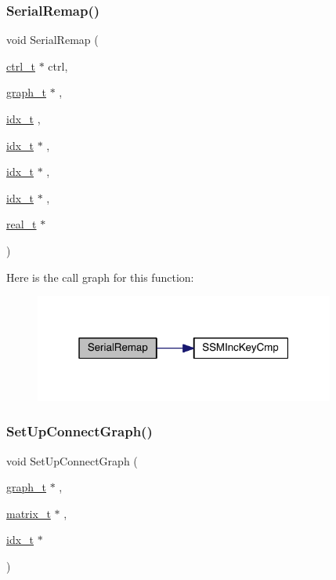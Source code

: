 \subsubsection{\texorpdfstring{Serial\+Remap()}{SerialRemap()}}
{\footnotesize\ttfamily void Serial\+Remap (\begin{DoxyParamCaption}\item[{\hyperlink{a00742}{ctrl\+\_\+t} $\ast$}]{ctrl,  }\item[{\hyperlink{a00734}{graph\+\_\+t} $\ast$}]{,  }\item[{\hyperlink{a00876_aaa5262be3e700770163401acb0150f52}{idx\+\_\+t}}]{,  }\item[{\hyperlink{a00876_aaa5262be3e700770163401acb0150f52}{idx\+\_\+t} $\ast$}]{,  }\item[{\hyperlink{a00876_aaa5262be3e700770163401acb0150f52}{idx\+\_\+t} $\ast$}]{,  }\item[{\hyperlink{a00876_aaa5262be3e700770163401acb0150f52}{idx\+\_\+t} $\ast$}]{,  }\item[{\hyperlink{a00876_a1924a4f6907cc3833213aba1f07fcbe9}{real\+\_\+t} $\ast$}]{ }\end{DoxyParamCaption})}

Here is the call graph for this function\+:\nopagebreak
\begin{figure}[H]
\begin{center}
\leavevmode
\includegraphics[width=280pt]{a00951_a0a618b7fb342f6de87bfbd31dd0c4580_cgraph}
\end{center}
\end{figure}
\mbox{\label{a00951_aba068efc89c0755b3e2d3723f74d6416}} 
\subsubsection{\texorpdfstring{Set\+Up\+Connect\+Graph()}{SetUpConnectGraph()}}
{\footnotesize\ttfamily void Set\+Up\+Connect\+Graph (\begin{DoxyParamCaption}\item[{\hyperlink{a00734}{graph\+\_\+t} $\ast$}]{,  }\item[{\hyperlink{a00754}{matrix\+\_\+t} $\ast$}]{,  }\item[{\hyperlink{a00876_aaa5262be3e700770163401acb0150f52}{idx\+\_\+t} $\ast$}]{ }\end{DoxyParamCaption})}

